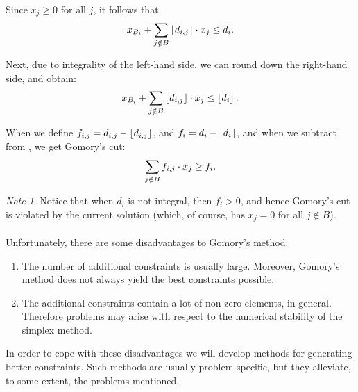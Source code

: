 \documentclass[titlepage]{book}
\theoremstyle{plain}
\theoremstyle{definition}
\theoremstyle{remark}
\newtheorem{note}{Note}
\begin{document}
Since $x_j\geq 0$ for all $j$, it follows that 
\begin{equation}
x_{B_i}+\sumndomain[j]{B}{\floor{d_{i,j}}\cdot x_j}\leq d_i.
\end{equation}

Next, due to integrality of the left-hand side, we can round down the right-hand side, and obtain:
\begin{equation}
x_{B_i}+\sumndomain[j]{B}{\floor{d_{i,j}}\cdot x_j}\leq\floor{d_i}.\eqnlab{gc-theory2}
\end{equation}

When we define $f_{i,j}=d_{i,j}-\floor{d_{i,j}}$, and $f_i=d_i-\floor{d_i}$, and when we subtract  from , we get Gomory's cut:
\begin{equation}
\sumndomain[j]{B}{f_{i,j}\cdot x_j}\geq f_i.
\end{equation}

\begin{note}
Notice that when $d_i$ is not integral, then $f_i>0$, and hence Gomory's cut is violated by the current solution (which, of course, has $x_j=0$ for all $j\notin B$).
\end{note}

\paragraph{}
Unfortunately, there are some disadvantages to Gomory's method:
\begin{enumerate}
 \item The number of additional constraints is usually large. Moreover, Gomory's method does not always yield the best constraints possible.
 \item The additional constraints contain a lot of non-zero elements, in general. Therefore problems may arise with respect to the numerical stability of the simplex method.
\end{enumerate}
In order to cope with these disadvantages we will develop methods for generating better constraints. Such methods are usually problem specific, but they alleviate, to some extent, the problems mentioned.
\end{document}
